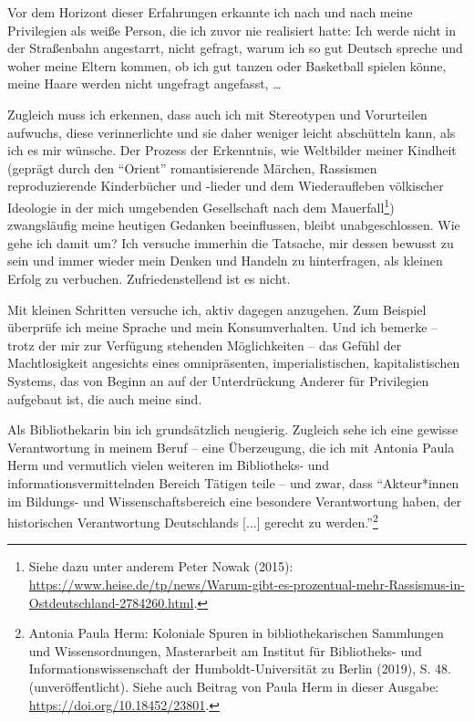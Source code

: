 \documentclass[a4paper,
fontsize=11pt,
oneside,
numbers=noperiodatend,
parskip=half-,
bibliography=totoc,
final
]{scrartcl}
\begin{document}
Vor dem Horizont dieser Erfahrungen erkannte ich nach und nach meine
Privilegien als weiße Person, die ich zuvor nie realisiert hatte: Ich
werde nicht in der Straßenbahn angestarrt, nicht gefragt, warum ich so
gut Deutsch spreche und woher meine Eltern kommen, ob ich gut tanzen
oder Basketball spielen könne, meine Haare werden nicht ungefragt
angefasst, \ldots{}

Zugleich muss ich erkennen, dass auch ich mit Stereotypen und
Vorurteilen aufwuchs, diese verinnerlichte und sie daher weniger leicht
abschütteln kann, als ich es mir wünsche. Der Prozess der Erkenntnis,
wie Weltbilder meiner Kindheit (geprägt durch den \enquote{Orient}
romantisierende Märchen, Rassismen reproduzierende Kinderbücher und
-lieder und dem Wiederaufleben völkischer Ideologie in der mich
umgebenden Gesellschaft nach dem Mauerfall\footnote{Siehe dazu unter anderem
  Peter Nowak (2015):
  \url{https://www.heise.de/tp/news/Warum-gibt-es-prozentual-mehr-Rassismus-in-Ostdeutschland-2784260.html}.})
zwangsläufig meine heutigen Gedanken beeinflussen, bleibt
unabgeschlossen. Wie gehe ich damit um? Ich versuche immerhin die
Tatsache, mir dessen bewusst zu sein und immer wieder mein Denken und
Handeln zu hinterfragen, als kleinen Erfolg zu verbuchen.
Zufriedenstellend ist es nicht.

Mit kleinen Schritten versuche ich, aktiv dagegen anzugehen. Zum
Beispiel überprüfe ich meine Sprache und mein Konsumverhalten. Und ich
bemerke -- trotz der mir zur Verfügung stehenden Möglichkeiten -- das
Gefühl der Machtlosigkeit angesichts eines omnipräsenten,
imperialistischen, kapitalistischen Systems, das von Beginn an auf der
Unterdrückung Anderer für Privilegien aufgebaut ist, die auch meine
sind.

Als Bibliothekarin bin ich grundsätzlich neugierig. Zugleich sehe ich
eine gewisse Verantwortung in meinem Beruf -- eine Überzeugung, die ich
mit Antonia Paula Herm und vermutlich vielen weiteren im Bibliotheks-
und informationsvermittelnden Bereich Tätigen teile -- und zwar, dass
\enquote{Akteur*innen im Bildungs- und Wissenschaftsbereich eine
besondere Verantwortung haben, der historischen Verantwortung
Deutschlands {[}...{]} gerecht zu werden.}\footnote{Antonia Paula Herm:
  Koloniale Spuren in bibliothekarischen Sammlungen und
  Wissensordnungen, Masterarbeit am Institut für Bibliotheks- und
  Informationswissenschaft der Humboldt-Universität zu Berlin (2019), S.
  48. (unveröffentlicht). Siehe auch Beitrag von Paula Herm in dieser
  Ausgabe: \url{https://doi.org/10.18452/23801}.}
\end{document}

